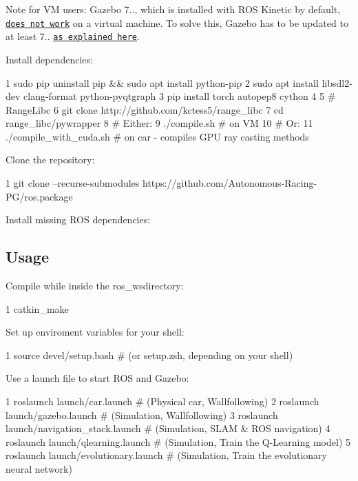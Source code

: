 Note for VM users\+: Gazebo 7.., which is installed with R\+OS Kinetic by default, \href{https://bitbucket.org/osrf/gazebo/issues/1837/vmware-rendering-z-ordering-appears-random}{\tt does not work} on a virtual machine. To solve this, Gazebo has to be updated to at least 7.. \href{http://gazebosim.org/tutorials?cat=install&tut=install_ubuntu&ver=7.0#Alternativeinstallation:step-by-step}{\tt as explained here}.

Install dependencies\+:


\begin{DoxyCode}
1 sudo pip uninstall pip && sudo apt install python-pip
2 sudo apt install libsdl2-dev clang-format python-pyqtgraph
3 pip install torch autopep8 cython
4 
5 # RangeLibc
6 git clone http://github.com/kctess5/range\_libc
7 cd range\_libc/pywrapper
8 # Either:
9 ./compile.sh            # on VM
10 # Or:
11 ./compile\_with\_cuda.sh  # on car - compiles GPU ray casting methods
\end{DoxyCode}


Clone the repository\+:


\begin{DoxyCode}
1 git clone --recurse-submodules https://github.com/Autonomous-Racing-PG/ros.package
\end{DoxyCode}


Install missing R\+OS dependencies\+:




\subsection*{Usage}

Compile while inside the {\ttfamily ros\+\_\+ws}directory\+:


\begin{DoxyCode}
1 catkin\_make
\end{DoxyCode}


Set up enviroment variables for your shell\+:


\begin{DoxyCode}
1 source devel/setup.bash # (or setup.zsh, depending on your shell)
\end{DoxyCode}


Use a launch file to start R\+OS and Gazebo\+:


\begin{DoxyCode}
1 roslaunch launch/car.launch # (Physical car, Wallfollowing)
2 roslaunch launch/gazebo.launch # (Simulation, Wallfollowing)
3 roslaunch launch/navigation\_stack.launch # (Simulation, SLAM & ROS navigation)
4 roslaunch launch/qlearning.launch # (Simulation, Train the Q-Learning model)
5 roslaunch launch/evolutionary.launch # (Simulation, Train the evolutionary neural network)
\end{DoxyCode}



